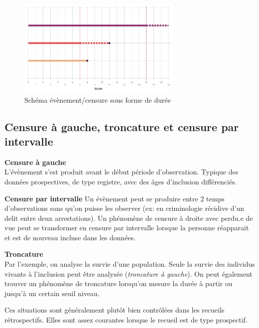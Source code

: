 \documentclass[
  12pt,
  letterpaper,
  DIV=11,
  numbers=noendperiod,
  onepage,
  openany]{scrreprt}
\begin{document}
\begin{figure}

\caption{Schéma évènement/censure sous forme de durée}

{\centering \includegraphics[width=0.7\textwidth,height=\textheight]{images/cens2.png}

}

\end{figure}

\hypertarget{censure-uxe0-gauche-troncature-et-censure-par-intervalle}{%
\subsection{Censure à gauche, troncature et censure par
intervalle}\label{censure-uxe0-gauche-troncature-et-censure-par-intervalle}}

\textbf{Censure à gauche}\\
L'évènement s'est produit avant le début période d'observation. Typique
des données prospectives, de type registre, avec des âges d'inclusion
différenciés.

\textbf{Censure par intervalle} Un évènement peut se produire entre 2
temps d'observations sans qu'on puisse les observer (ex: en criminologie
récidive d'un delit entre deux arrestations). Un phénomène de censure à
droite avec perdu.e de vue peut se transformer en censure par intervalle
lorsque la personne réapparait et est de nouveau incluse dans les
données.

\textbf{Troncature}\\
Par l'exemple, on analyse la survie d'une population. Seule la survie
des individus vivants à l'inclusion peut être analysée (\emph{troncature
à gauche}). On peut également trouver un phénomène de troncature
lorsqu'on mesure la durée à partir ou jusqu'à un certain seuil niveau.

Ces situations sont généralement plutôt bien contrôlées dans les
recueils rétrospectifs. Elles sont assez courantes lorsque le recueil
est de type prospectif.
\end{document}

